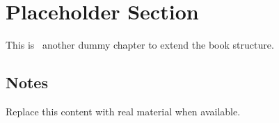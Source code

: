 
\section{Placeholder Section}
This is~\cite{abdulmaksoudTransformerBasedSensorFusion2025} another dummy chapter to extend the book structure.

\subsection{Notes}
Replace this content with real material when available.
